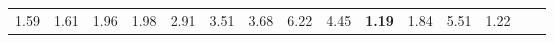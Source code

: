 \begin{tabular}{ll|rrrrrrrrr|rrrr}
  


  
  1.59 & 1.61 & 1.96 & 1.98 & 2.91 & 3.51 & 3.68 & 6.22 & 4.45 & \textbf{1.19} & 1.84 & 5.51 & 1.22 \\


\end{tabular}
